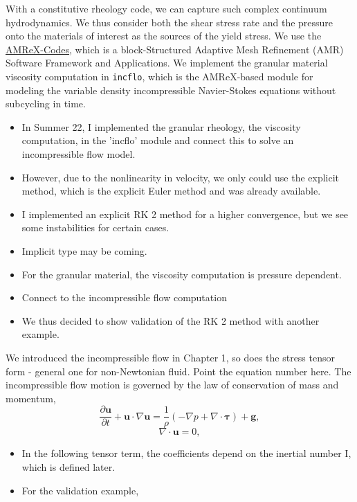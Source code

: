 \par
With a constitutive rheology code, we can capture such complex continuum hydrodynamics. We thus consider both the shear stress rate and the pressure onto the materials of interest as the sources of the yield stress. 
We use the \href{https://amrex-codes.github.io/index.html}{{\color{blue}AMReX-Codes}}, which is a block-Structured Adaptive Mesh Refinement (AMR) Software Framework and Applications. 
We implement the granular material viscosity computation in \verb+incflo+, which is the AMReX-based module for modeling the variable density incompressible Navier-Stokes equations without subcycling in time.
\begin{itemize}
  \item In Summer 22, I implemented the granular rheology, the viscosity computation, in the  'incflo' module and connect this to solve an incompressible flow model. 
  \item  However, due to the nonlinearity in velocity, we only could use the explicit method, which is the explicit Euler method and was already available.
  \item I implemented an explicit RK 2 method for a higher convergence, but we see some instabilities for certain cases.
  \item Implicit type may be coming. 
  \item For the granular material, the viscosity computation is pressure dependent. 
  \item Connect to the incompressible flow computation 

  
  \item We thus decided to show validation of the RK 2 method with another example.  
\end{itemize}


{\color{blue}We introduced the incompressible flow in Chapter 1, so does the stress tensor form - general one for non-Newtonian fluid. Point the equation number here.}
The incompressible flow motion is governed by the law of conservation of mass and momentum,
\begin{equation}
  \frac{\partial {\bm u}}{\partial t} 
  + {\bm u} \cdot \nabla {\bm u} = \frac{1}{\rho}
  \left( 
    -\nabla p + \nabla \cdot {\bm {\bm \tau}}\right) + {\bm g},
\end{equation}
\begin{equation}
  \nabla \cdot {\bm u} = 0,
\end{equation}
\begin{itemize}
  \item In the following tensor term, the coefficients depend on the inertial number I, which is defined later. 
  \item For the validation example, 
\end{itemize}
